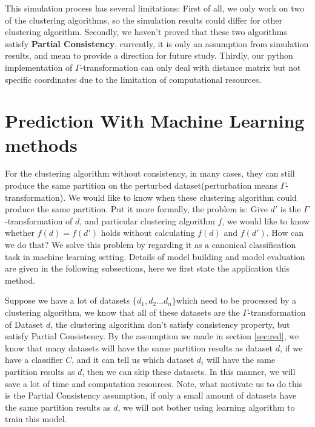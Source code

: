 \documentclass{uonmathreport}
\begin{document}
This simulation process has several limitations: First of all, we only work on two of the clustering algorithms, so the simulation results could differ for other clustering algorithm. Secondly, we haven't proved that these two algorithms satisfy \textbf{Partial Consistency}, currently, it is only an assumption from simulation results, and mean to provide a direction for future study. Thirdly, our python implementation of $\Gamma$-transformation can only deal with distance matrix but not specific coordinates due to the limitation of computational resources.

\section{Prediction With Machine Learning methods} \label{sec:Classification}


For the clustering algorithm without consistency, in many cases, they can still produce the same partition on the perturbed dataset(perturbation means $\Gamma$-transformation). We would like to know when these clustering algorithm could produce the same partition. Put it more formally, the problem is: Give $d'$ is the $\Gamma$-transformation of $d$, and particular clustering algorithm $f$, we would like to know whether $f(d)=f(d')$ holds without calculating $f(d)$ and $f(d')$. How can we do that? We solve this problem by regarding it as a canonical classification task in machine learning setting. Details of model building and model evaluation are given in the following subsections, here we first state the application this method.

Suppose we have a lot of datasets $\{d_1,d_2\ldots d_n\}$which need to be processed by a clustering algorithm, we know that all of these datasets are the $\Gamma$-transformation of Dataset $d$, the clustering algorithm don't satisfy consistency property, but satisfy Partial Consistency. By the assumption we made in section \ref{sec:red}, we know that many datasets will have the same  partition results as dataset $d$, if we have a classifier $C$, and it can tell us which dataset $d_i$ will have the same partition results as $d$, then we can skip these datasets. In this manner, we will save a lot of time and computation resources. Note, what motivate us to do this is the Partial Consistency assumption, if only a small amount of datasets have the same partition results as $d$, we will not bother using learning algorithm to train this model.
\end{document}
